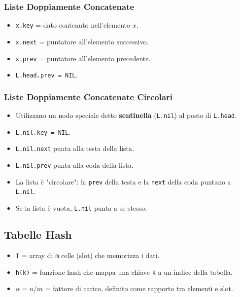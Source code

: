 \subsubsection{Liste Doppiamente Concatenate}
\begin{itemize}
    \item \texttt{x.key} = dato contenuto nell'elemento $x$.
    \item \texttt{x.next} = puntatore all'elemento successivo.
    \item \texttt{x.prev} = puntatore all'elemento precedente.
    \item \texttt{L.head.prev = NIL}.
\end{itemize}

\subsubsection{Liste Doppiamente Concatenate Circolari}
\begin{itemize}
    \item Utilizzano un nodo speciale detto \textbf{sentinella} (\texttt{L.nil}) al posto di \texttt{L.head}.
    \item \texttt{L.nil.key = NIL}.
    \item \texttt{L.nil.next} punta alla testa della lista.
    \item \texttt{L.nil.prev} punta alla coda della lista.
    \item La lista è "circolare": la \texttt{prev} della testa e la \texttt{next} della coda puntano a \texttt{L.nil}.
    \item Se la lista è vuota, \texttt{L.nil} punta a se stesso.
\end{itemize}

\subsection{Tabelle Hash}
\begin{itemize}
    \item \texttt{T} = array di \texttt{m} celle (slot) che memorizza i dati.
    \item \texttt{h(k)} = funzione hash che mappa una chiave \texttt{k} a un indice della tabella.
    \item \texttt{$\alpha=n/m$} = fattore di carico, definito come rapporto tra elementi e slot.
\end{itemize}


